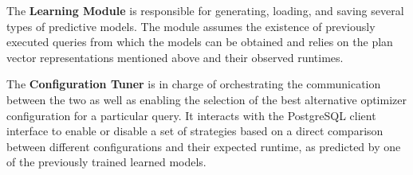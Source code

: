 The \textbf{Learning Module} is responsible for generating, loading, and saving several types of predictive models. The module assumes the existence of previously executed queries from which the models can be obtained and relies on the plan vector representations mentioned above and their observed runtimes.

The \textbf{Configuration Tuner} is in charge of orchestrating the communication between the two as well as enabling the selection of the best alternative optimizer configuration for a particular query. It interacts with the PostgreSQL client interface to enable or disable a set of strategies based on a direct comparison between different configurations and their expected runtime, as predicted by one of the previously trained learned models.
